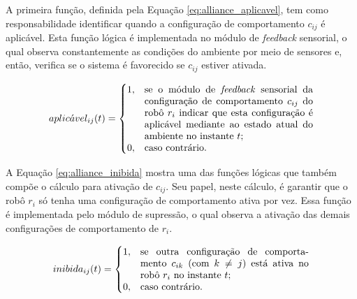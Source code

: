             A primeira função, definida pela Equação \ref{eq:alliance_aplicavel}, tem como responsabilidade identificar quando a configuração de comportamento $c_{ij}$ é aplicável. Esta função lógica é implementada no módulo de \textit{feedback} sensorial, o qual observa constantemente as condições do ambiente por meio de sensores e, então, verifica se o sistema é favorecido se $c_{ij}$ estiver ativada.
            
            \begin{equation} \label{eq:alliance_aplicavel}
                aplic\acute{a}vel_{ij}(t) =
                \begin{cases}
                    1, & \parbox[t]{.5\textwidth}{se o módulo de \textit{feedback} sensorial da configuração de comportamento $c_{ij}$ do robô $r_i$ indicar que esta configuração é aplicável mediante ao estado atual do ambiente no instante $t$;} \\
                    0, & \text{caso contrário.}
                \end{cases}
            \end{equation}
            
            A Equação \ref{eq:alliance_inibida} mostra uma das funções lógicas que também compõe o cálculo para ativação de $c_{ij}$. Seu papel, neste cálculo, é garantir que o robô $r_i$ só tenha uma configuração de comportamento ativa por vez. Essa função é implementada pelo módulo de supressão, o qual observa a ativação das demais configurações de comportamento de $r_i$. 
            
            \begin{equation} \label{eq:alliance_inibida}
                inibida_{ij}(t) =
                \begin{cases}
                    1, & \parbox[t]{.5\textwidth}{se outra configuração de comportamento $c_{ik}$ (com $k \neq j$) está ativa no robô $r_i$ no instante $t$;} \\
                    0, & \text{caso contrário.}
                \end{cases}
            \end{equation}
            
